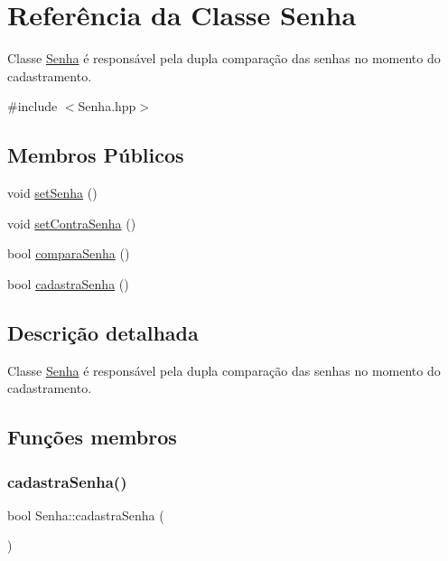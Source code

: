 \hypertarget{class_senha}{}\section{Referência da Classe Senha}
\label{class_senha}


Classe \mbox{\hyperlink{class_senha}{Senha}} é responsável pela dupla comparação das senhas no momento do cadastramento.  




{\ttfamily \#include $<$Senha.\+hpp$>$}

\subsection*{Membros Públicos}
\begin{DoxyCompactItemize}
\item 
void \mbox{\hyperlink{class_senha_a28bad3d6b586b1134d4c35326b0bb822}{set\+Senha}} ()
\item 
void \mbox{\hyperlink{class_senha_aaa2e8613c086898a6dcb6ae746f11b20}{set\+Contra\+Senha}} ()
\item 
bool \mbox{\hyperlink{class_senha_a942494d99f59fd34396763398dbca468}{compara\+Senha}} ()
\item 
bool \mbox{\hyperlink{class_senha_a497007300e0cfba3abb6daecfeeaaab4}{cadastra\+Senha}} ()
\end{DoxyCompactItemize}


\subsection{Descrição detalhada}
Classe \mbox{\hyperlink{class_senha}{Senha}} é responsável pela dupla comparação das senhas no momento do cadastramento. 

\subsection{Funções membros}
\mbox{\label{class_senha_a497007300e0cfba3abb6daecfeeaaab4}} 
\subsubsection{\texorpdfstring{cadastraSenha()}{cadastraSenha()}}
{\footnotesize\ttfamily bool Senha\+::cadastra\+Senha (\begin{DoxyParamCaption}{ }\end{DoxyParamCaption})}


